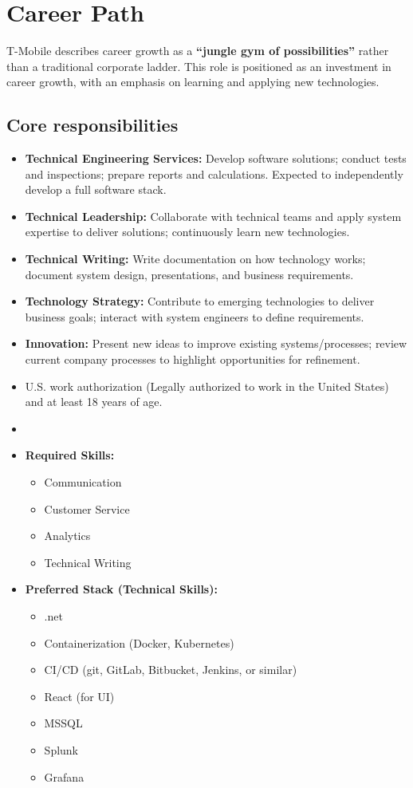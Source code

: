 \documentclass[11pt]{article}
\begin{document}
\section*{Career Path}
T-Mobile describes career growth as a \textbf{``jungle gym of possibilities''} 
rather than a traditional corporate ladder. This role is positioned as an 
investment in career growth, with an emphasis on learning and applying 
new technologies.

\newpage
\subsection*{Core responsibilities}
\begin{itemize}
  \item \textbf{Technical Engineering Services:} Develop software solutions; 
    conduct tests and inspections; prepare reports and calculations. 
    Expected to independently develop a full software stack.
  \item \textbf{Technical Leadership:} Collaborate with technical teams and 
    apply system expertise to deliver solutions; continuously learn new 
    technologies.
  \item \textbf{Technical Writing:} Write documentation on how technology 
    works; document system design, presentations, and business requirements.
  \item \textbf{Technology Strategy:} Contribute to emerging technologies to 
    deliver business goals; interact with system engineers to define 
    requirements.
  \item \textbf{Innovation:} Present new ideas to improve existing 
    systems/processes; review current company processes to highlight 
    opportunities for refinement.
  \item U.S. work authorization (Legally authorized to work in the United 
    States) and at least 18 years of age.
  
  \item \hrulefill
  
  \item \textbf{Required Skills:}
  \begin{itemize}
    \item Communication
    \item Customer Service
    \item Analytics
    \item Technical Writing
  \end{itemize}
  
  \item \textbf{Preferred Stack (Technical Skills):}
  \begin{itemize}
    \item .net
    \item Containerization (Docker, Kubernetes)
    \item CI/CD (git, GitLab, Bitbucket, Jenkins, or similar)
    \item React (for UI)
    \item MSSQL
    \item Splunk
    \item Grafana
  \end{itemize}
  

\end{itemize}
\end{document}
